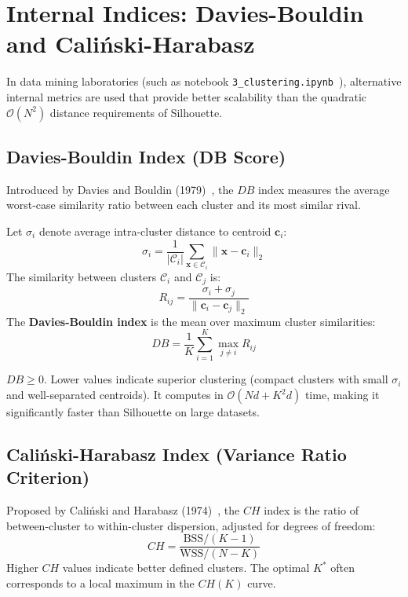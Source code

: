 \section{Internal Indices: Davies-Bouldin and Cali\'nski-Harabasz}
\label{sec:dm-additional-internal-indices}

In data mining laboratories (such as notebook \texttt{3\_clustering.ipynb}~\cite{tan2018}), alternative internal metrics are used that provide better scalability than the quadratic $\mathcal{O}(N^2)$ distance requirements of Silhouette.

\subsection{Davies-Bouldin Index (DB Score)}
Introduced by Davies and Bouldin (1979)~\cite{davies1979}, the $DB$ index measures the average worst-case similarity ratio between each cluster and its most similar rival.

Let $\sigma_i$ denote average intra-cluster distance to centroid $\mathbf{c}_i$:
\begin{equation}
\label{eq:dm-db-sigma-en}
\sigma_i = \frac{1}{|\mathcal{C}_i|} \sum_{\mathbf{x} \in \mathcal{C}_i} \|\mathbf{x} - \mathbf{c}_i\|_2
\end{equation}
The similarity between clusters $\mathcal{C}_i$ and $\mathcal{C}_j$ is:
\begin{equation}
\label{eq:dm-db-rij-en}
R_{ij} = \frac{\sigma_i + \sigma_j}{\|\mathbf{c}_i - \mathbf{c}_j\|_2}
\end{equation}
The \textbf{Davies-Bouldin index} is the mean over maximum cluster similarities:
\begin{equation}
\label{eq:dm-db-score-en}
DB = \frac{1}{K} \sum_{i=1}^K \max_{j \ne i} R_{ij}
\end{equation}
\begin{property}
$DB \ge 0$. Lower values indicate superior clustering (compact clusters with small $\sigma_i$ and well-separated centroids). It computes in $\mathcal{O}(Nd + K^2 d)$ time, making it significantly faster than Silhouette on large datasets.
\end{property}

\subsection{Cali\'nski-Harabasz Index (Variance Ratio Criterion)}
Proposed by Cali\'nski and Harabasz (1974)~\cite{calinski1974}, the $CH$ index is the ratio of between-cluster to within-cluster dispersion, adjusted for degrees of freedom:
\begin{equation}
\label{eq:dm-calinski-harabasz-en}
CH = \frac{\mathrm{BSS} / (K - 1)}{\mathrm{WSS} / (N - K)}
\end{equation}
Higher $CH$ values indicate better defined clusters. The optimal $K^*$ often corresponds to a local maximum in the $CH(K)$ curve.

